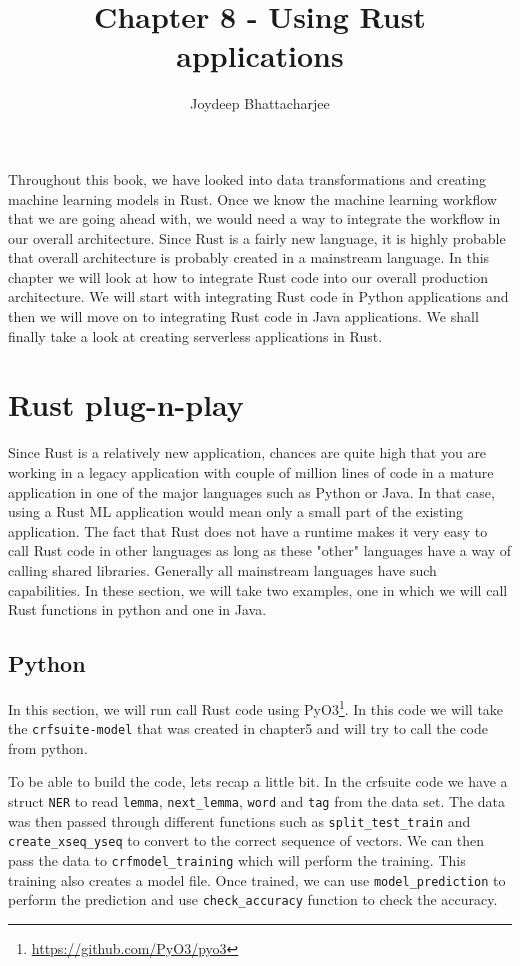 \documentclass{book}
\begin{document}
\title{Chapter 8 - Using Rust applications}
\author {Joydeep Bhattacharjee}

\maketitle

Throughout this book, we have looked into data transformations and creating machine learning models in Rust. Once we know the machine learning workflow that we are going ahead with, we would need a way to integrate the workflow in our overall architecture. Since Rust is a fairly new language, it is highly probable that overall architecture is probably created in a mainstream language. In this chapter we will look at how to integrate Rust code into our overall production architecture. We will start with integrating Rust code in Python applications and then we will move on to integrating Rust code in Java applications. We shall finally take a look at creating serverless applications in Rust.

\section{Rust plug-n-play}%
Since Rust is a relatively new application, chances are quite high that you are working in a legacy application with couple of million lines of code in a mature application in one of the major languages such as Python or Java. In that case, using a Rust ML application would mean only a small part of the existing application. The fact that Rust does not have a runtime makes it very easy to call Rust code in other languages as long as these "other" languages have a way of calling shared libraries. Generally all mainstream languages have such capabilities. In these section, we will take two examples, one in which we will call Rust functions in python and one in Java.

\subsection{Python}%
In this section, we will run call Rust code using PyO3\footnote{\href{}{https://github.com/PyO3/pyo3}}. In this code we will take the \lstinline{crfsuite-model} that was created in chapter5 and will try to call the code from python.

To be able to build the code, lets recap a little bit. In the crfsuite code we have a struct \lstinline{NER} to read \lstinline{lemma}, \lstinline{next_lemma}, \lstinline{word} and \lstinline{tag} from the data set. The data was then passed through different functions such as \lstinline{split_test_train} and \lstinline{create_xseq_yseq} to convert to the correct sequence of vectors. We can then pass the data to \lstinline{crfmodel_training} which will perform the training. This training also creates a model file. Once trained, we can use \lstinline{model_prediction} to perform the prediction and use \lstinline{check_accuracy} function to check the accuracy.
\end{document}
